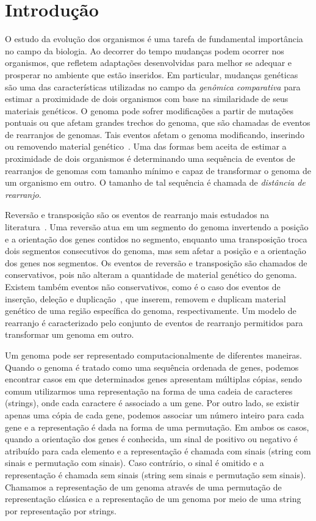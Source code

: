 \chapter{Introdução}\label{chapter:XDSEJBWV}

O estudo da evolução dos organismos é uma tarefa de fundamental importância no campo da biologia. Ao decorrer do tempo mudanças podem ocorrer nos organismos, que refletem adaptações desenvolvidas para melhor se adequar e prosperar no ambiente que estão inseridos. Em particular, mudanças genéticas são uma das características utilizadas no campo da \emph{genômica comparativa} para estimar a proximidade de dois organismos com base na similaridade de seus materiais genéticos. O genoma pode sofrer modificações a partir de mutações pontuais ou que afetam grandes trechos do genoma, que são chamadas de eventos de rearranjos de genomas. Tais eventos afetam o genoma modificando, inserindo ou removendo material genético~\cite{2009-fertin-etal}. Uma das formas bem aceita de estimar a proximidade de dois organismos é determinando uma sequência de eventos de rearranjos de genomas com tamanho mínimo e capaz de transformar o genoma de um organismo em outro. O tamanho de tal sequência é chamada de \emph{distância de rearranjo}.

Reversão e transposição são os eventos de rearranjo mais estudados na literatura~\cite{1999-hannenhalli-pevzner,1999-caprara,2012-bulteau-etal,2019b-oliveira-etal}. Uma reversão atua em um segmento do genoma invertendo a posição e a orientação dos genes contidos no segmento, enquanto uma transposição troca dois segmentos consecutivos do genoma, mas sem afetar a posição e a orientação dos genes nos segmentos. Os eventos de reversão e transposição são chamados de conservativos, pois não alteram a quantidade de material genético do genoma. Existem também eventos não conservativos, como é o caso dos eventos de inserção, deleção e duplicação~\cite{2013-willing-etal,2012-elmabrouk-sankoff,2008-kahn-raphael,2020-mane-etal,2009-bader}, que inserem, removem e duplicam material genético de uma região específica do genoma, respectivamente. Um modelo de rearranjo é caracterizado pelo conjunto de eventos de rearranjo permitidos para transformar um genoma em outro.

Um genoma pode ser representado computacionalmente de diferentes maneiras. Quan\-do o genoma é tratado como uma sequência ordenada de genes, podemos encontrar casos em que determinados genes apresentam múltiplas cópias, sendo comum utilizarmos uma representação na forma de uma cadeia de caracteres (strings), onde cada caractere é associado a um gene. Por outro lado, se existir apenas uma cópia de cada gene, podemos associar um número inteiro para cada gene e a representação é dada na forma de uma permutação. Em ambos os casos, quando a orientação dos genes é conhecida, um sinal de positivo ou negativo é atribuído para cada elemento e a representação é chamada com sinais (string com sinais e permutação com sinais). Caso contrário, o sinal é omitido e a representação é chamada sem sinais (string sem sinais e permutação sem sinais). Chamamos a representação de um genoma através de uma permutação de representação clássica e a representação de um genoma por meio de uma string por representação por strings.


